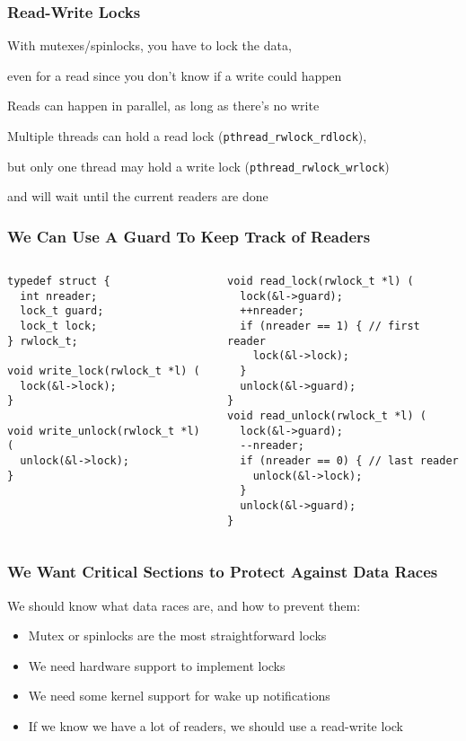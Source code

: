   \begin{frame}
    \frametitle{Read-Write Locks}

    With mutexes/spinlocks, you have to lock the data,

    even for a read since you don't know if a write could happen

    \vspace{2em}

    Reads can happen in parallel, as long as there's no write

    \vspace{2em}

    Multiple threads can hold a read lock ({\tt pthread\_rwlock\_rdlock}),

    but only one thread may hold a write lock ({\tt pthread\_rwlock\_wrlock})

    and will wait until the current readers are done
  \end{frame}

  \begin{frame}[fragile]
    \frametitle{We Can Use A Guard To Keep Track of Readers}

    \begin{columns}
      \begin{column}{0.5\textwidth}
        \begin{lstlisting}
typedef struct {
  int nreader;
  lock_t guard;
  lock_t lock;
} rwlock_t;

void write_lock(rwlock_t *l) (
  lock(&l->lock);
}

void write_unlock(rwlock_t *l) (
  unlock(&l->lock);
}
        \end{lstlisting}
      \end{column}
      \begin{column}{0.5\textwidth}
        \begin{lstlisting}
void read_lock(rwlock_t *l) (
  lock(&l->guard);
  ++nreader;
  if (nreader == 1) { // first reader
    lock(&l->lock);
  }
  unlock(&l->guard);
}
void read_unlock(rwlock_t *l) (
  lock(&l->guard);
  --nreader;
  if (nreader == 0) { // last reader
    unlock(&l->lock);
  }
  unlock(&l->guard);
}
        \end{lstlisting}
      \end{column}
    \end{columns}
  \end{frame}

  \begin{frame}
    \frametitle{We Want Critical Sections to Protect Against Data Races}

    We should know what data races are, and how to prevent them:
    \begin{itemize}
      \item Mutex or spinlocks are the most straightforward locks
      \item We need hardware support to implement locks
      \item We need some kernel support for wake up notifications
      \item If we know we have a lot of readers, we should use a read-write lock
    \end{itemize}
  \end{frame}

